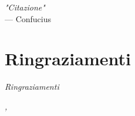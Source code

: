 
\cleardoublepage
{}
{}

\begin{flushright} {
	\slshape
	"Citazione"
} \\
	\medskip
		--- Confucius
\end{flushright}

\begingroup
\let\clearpage\relax
\let\cleardoublepage\relax

\chapter*{Ringraziamenti}

\noindent \textit{Ringraziamenti}\\

\bigskip

\noindent \textit{\luogo, \dataDiscussione}
\hfill \autore

\endgroup